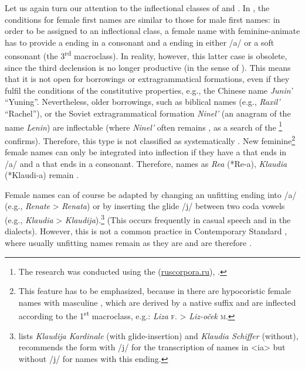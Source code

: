 \documentclass[output=paper,colorlinks,citecolor=brown]{langscibook}
\begin{document}
\largerpage[2]
Let us again turn our attention to the inflectional classes of  and . In , the conditions for female first names are similar to those for male first names: in order to be assigned to an inflectional class, a female name with feminine-animate  has to provide a  ending in a consonant and a  ending in either /a/ or a soft consonant (the 3\textsuperscript{rd} macroclass). In reality, however, this latter case is obsolete, since the third declension is no longer productive (in the sense of \citealt{dressler1997, dressler2003}). This means that it is not open for borrowings or extragrammatical formations, even if they fulfil the conditions of the constitutive properties, e.g., the Chinese name \emph{Junin'} ``Yuning''. Nevertheless, older borrowings, such as biblical names (e.g., \emph{Raxil'} ``Rachel''), or the Soviet extragrammatical formation \emph{Ninel'} (an anagram of the name \emph{Lenin}) are inflectable (where \emph{Ninel'} often remains , as a search of the \footnote{The research was conducted using the  (\href{https://ruscorpora.ru/}{ruscorpora.ru}), \citet{savcuketal2024}.}
confirms). Therefore, this type is not classified as systematically . New feminine\footnote{This  feature has to be emphasized, because in  there are hypocoristic female names with masculine , which are derived by a native suffix and are inflected according to the 1\textsuperscript{st} macroclass, e.g.: \emph{Liza} \textsc{f.} \textgreater{} \emph{Liz-oček} \textsc{m.}} female names can only be integrated into inflection if they have a  that ends in /a/ and a  that ends in a consonant. Therefore, names as \emph{Rea} (*Re-a), \emph{Klaudia} (*Klaudi-a) remain .

Female names can of course be adapted by changing an unfitting  ending into /a/ (e.g., \emph{Renate} \textgreater{} \emph{Renata}) or by inserting the glide /j/ between two coda vowels (e.g., \emph{Klaudia} \textgreater{} \emph{Klaudija}).\footnote{\citet{ageenko2010} lists \emph{Klaudija Kardinale} (with glide-insertion) and \emph{Klaudia Schiffer} (without), \citet{klysinskij2010} recommends the form with /j/ for the transcription of  names in \textless ia\textgreater{} but without /j/ for  names with this ending.} (This occurs frequently in casual speech and in the dialects). However, this is not a common practice in Contemporary Standard , where usually unfitting names remain as they are and are therefore .
\end{document}

